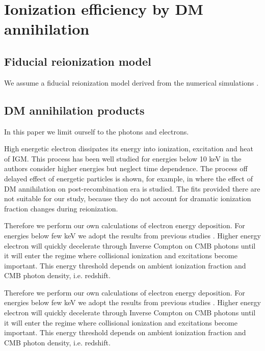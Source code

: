 \section{Ionization efficiency by DM annihilation}
\label{sec:DMspectrum}

\subsection{Fiducial reionization model}

We assume a fiducial reionization model derived from the numerical simulations \cite{Gnedin_2014}\cite{Gnedin_2014a}.

\subsection{DM annihilation products}
In this paper we limit ourself to the photons and electrons.


High energetic electron dissipates its energy into ionization, excitation and heat of IGM. This process has been well studied for energies below 10 keV in \cite{Shull_1979,Shull_1985,Dalgarno_1999,Furlanetto_2010,Vald_s_2010} the authors consider higher energies but neglect time dependence. The process off delayed effect of energetic particles is shown, for example, in \cite{2015arXiv150603812S} where the effect of DM annihilation on post-recombination era is studied. The fits provided there are not suitable for our study, because they do not account for dramatic ionization fraction changes during reionization.

Therefore we perform our own calculations of electron energy deposition. For energies below few keV we adopt the results from previous studies \cite{Shull_1985,Furlanetto_2010}. Higher energy electron will quickly decelerate through Inverse Compton on CMB photons until it will enter the regime where collisional ionization and excitations become important. This energy threshold depends on ambient ionization fraction and CMB photon density, i.e. redshift.

\cite{Slatyer_2009}
\cite{H_tsi_2009}
\cite{Evoli_2013}


Therefore we perform our own calculations of electron energy deposition. For energies below few keV we adopt the results from previous studies \cite{Shull_1985,Furlanetto_2010}. Higher energy electron will quickly decelerate through Inverse Compton on CMB photons until it will enter the regime where collisional ionization and excitations become important. This energy threshold depends on ambient ionization fraction and CMB photon density, i.e. redshift.

